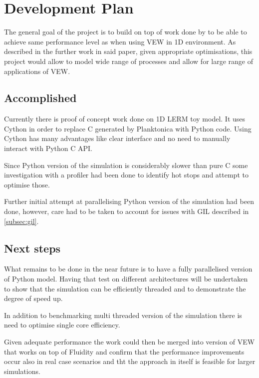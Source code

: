 \documentclass[12pt, a4paper]{report}
\begin{document}

\chapter{Development Plan}\label{ch:plan}

The general goal of the project is to build on top of work done by \cite{FluidityVEW}
to be able to achieve same performance level as when using VEW in 1D environment. As
described in the further work in said paper, given appropriate optimisations, this project
would allow to model wide range of processes and allow for large range of applications
of VEW.

\section{Accomplished}\label{sec:acc}

Currently there is proof of concept work done on 1D LERM toy model. It uses Cython
in order to replace C generated by Planktonica with Python code. Using Cython has
many advantages like clear interface and no need to manually interact with Python C API.

Since Python version of the simulation is considerably slower than pure C some investigation
with a profiler had been done to identify hot stops and attempt to optimise those.

Further initial attempt at parallelising Python version of the simulation had been done, however,
care had to be taken to account for issues with GIL described in \ref{subsec:gil}.

\section{Next steps}\label{sec:next}

What remains to be done in the near future is to have a fully parallelised version of Python model.
Having that test on different architectures will be undertaken to show that the simulation can be
efficiently threaded and to demonstrate the degree of speed up.

In addition to benchmarking multi threaded version of the simulation there is need to optimise
single core efficiency.

Given adequate performance the work could then be merged into version of VEW that works on top of Fluidity
and confirm that the performance improvements occur also in real case scenarios and tht the approach in itself
is feasible for larger simulations.
\end{document}
